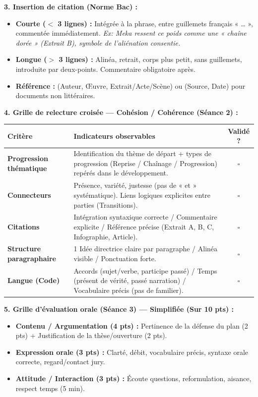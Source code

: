 \documentclass[11pt]{article}
\begin{document}
\noindent \textbf{3. Insertion de citation (Norme Bac) :}
\begin{itemize}
    \item \textbf{Courte ($<$ 3 lignes) :} Intégrée à la phrase, entre guillemets français « … », commentée immédiatement. \textit{Ex: Meka ressent ce poids comme une « chaîne dorée » (Extrait B), symbole de l'aliénation consentie.}
    \item \textbf{Longue ($>$ 3 lignes) :} Alinéa, retrait, corps plus petit, sans guillemets, introduite par deux-points. Commentaire obligatoire après.
    \item \textbf{Référence :} (Auteur, Œuvre, Extrait/Acte/Scène) ou (Source, Date) pour documents non littéraires.
\end{itemize}

\noindent \textbf{4. Grille de relecture croisée — Cohésion / Cohérence (Séance 2) :}
\begin{center}
    \begin{tabularx}{\linewidth}{|l|X|c|}\hline
    \rowcolor{popblueL} \textbf{Critère} & \textbf{Indicateurs observables} & \textbf{Validé ?} \\ \hline
    \textbf{Progression thématique} & Identification du thème de départ + types de progression (Reprise / Chaînage / Progression) repérés dans le développement. & $\square$ \\ \hline
    \textbf{Connecteurs} & Présence, variété, justesse (pas de « et » systématique). Liens logiques explicites entre parties (Transitions). & $\square$ \\ \hline
    \textbf{Citations} & Intégration syntaxique correcte / Commentaire explicite / Référence précise (Extrait A, B, C, Infographie, Article). & $\square$ \\ \hline
    \textbf{Structure paragraphaire} & 1 Idée directrice claire par paragraphe / Alinéa visible / Ponctuation forte. & $\square$ \\ \hline
    \textbf{Langue (Code)} & Accords (sujet/verbe, participe passé) / Temps (présent de vérité, passé narration) / Vocabulaire précis (pas de familier). & $\square$ \\ \hline
    \end{tabularx}
\end{center}

\noindent \textbf{5. Grille d'évaluation orale (Séance 3) — Simplifiée (Sur 10 pts) :}
\begin{itemize}
    \item \textbf{Contenu / Argumentation (4 pts) :} Pertinence de la défense du plan (2 pts) + Justification de la thèse/ouverture (2 pts).
    \item \textbf{Expression orale (3 pts) :} Clarté, débit, vocabulaire précis, syntaxe orale correcte, regard/contact jury.
    \item \textbf{Attitude / Interaction (3 pts) :} Écoute questions, reformulation, aisance, respect temps (5 min).
\end{itemize}
\end{document}
